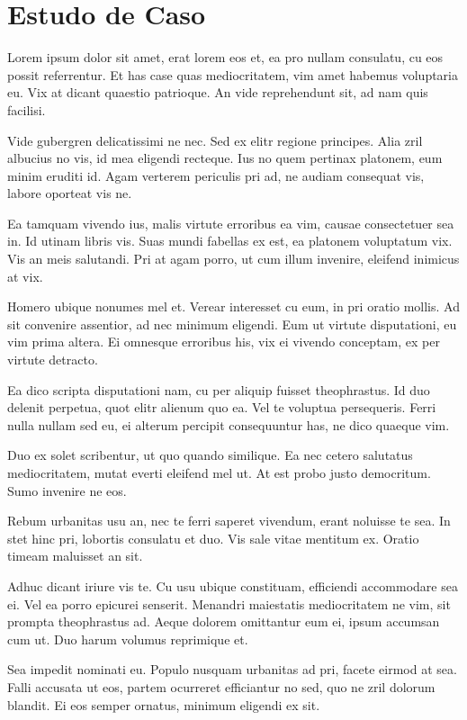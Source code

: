 \chapter{Estudo de Caso}
\label{chap:resultados}

	Lorem ipsum dolor sit amet, erat lorem eos et, ea pro nullam consulatu, cu eos possit referrentur. Et has case quas mediocritatem, vim amet habemus voluptaria eu. Vix at dicant quaestio patrioque. An vide reprehendunt sit, ad nam quis facilisi.

	Vide gubergren delicatissimi ne nec. Sed ex elitr regione principes. Alia zril albucius no vis, id mea eligendi recteque. Ius no quem pertinax platonem, eum minim eruditi id. Agam verterem periculis pri ad, ne audiam consequat vis, labore oporteat vis ne.

	Ea tamquam vivendo ius, malis virtute erroribus ea vim, causae consectetuer sea in. Id utinam libris vis. Suas mundi fabellas ex est, ea platonem voluptatum vix. Vis an meis salutandi. Pri at agam porro, ut cum illum invenire, eleifend inimicus at vix.

	Homero ubique nonumes mel et. Verear interesset cu eum, in pri oratio mollis. Ad sit convenire assentior, ad nec minimum eligendi. Eum ut virtute disputationi, eu vim prima altera. Ei omnesque erroribus his, vix ei vivendo conceptam, ex per virtute detracto.

	Ea dico scripta disputationi nam, cu per aliquip fuisset theophrastus. Id duo delenit perpetua, quot elitr alienum quo ea. Vel te voluptua persequeris. Ferri nulla nullam sed eu, ei alterum percipit consequuntur has, ne dico quaeque vim.

	Duo ex solet scribentur, ut quo quando similique. Ea nec cetero salutatus mediocritatem, mutat everti eleifend mel ut. At est probo justo democritum. Sumo invenire ne eos.

	Rebum urbanitas usu an, nec te ferri saperet vivendum, erant noluisse te sea. In stet hinc pri, lobortis consulatu et duo. Vis sale vitae mentitum ex. Oratio timeam maluisset an sit.

	Adhuc dicant iriure vis te. Cu usu ubique constituam, efficiendi accommodare sea ei. Vel ea porro epicurei senserit. Menandri maiestatis mediocritatem ne vim, sit prompta theophrastus ad. Aeque dolorem omittantur eum ei, ipsum accumsan cum ut. Duo harum volumus reprimique et.

	Sea impedit nominati eu. Populo nusquam urbanitas ad pri, facete eirmod at sea. Falli accusata ut eos, partem ocurreret efficiantur no sed, quo ne zril dolorum blandit. Ei eos semper ornatus, minimum eligendi ex sit.


